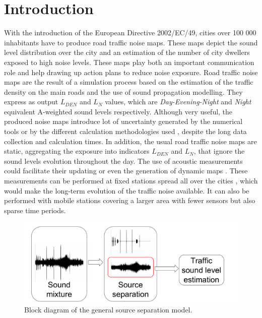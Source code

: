 \documentclass[twocolumn]{svjour3}          %
\begin{document}
\section{Introduction} \label{part:intro}

With the introduction of the European Directive 2002/\-EC/49, cities over 100 000 inhabitants have to produce road traffic noise maps. These maps depict the sound level distribution over the city and an estimation of the number of city dwellers exposed to high noise levels. These maps play both an important communication role and help drawing up action plans to reduce noise exposure. Road traffic noise maps are the result of a simulation process based on the estimation of the traffic density on the main roads and the use of sound propagation modelling. They express as output $L_ {DEN}$ and $L_N$ values, which are \textit{Day-Evening-Night} and \textit{Night} equivalent A-weighted sound levels respectively. Although very useful, the produced noise maps introduce lot of uncertainty generated by the numerical tools \cite{van_leeuwen_noise_2015} or by the different calculation methodologies used \cite{leroy_uncertainty_2010}\cite{garg_critical_2014}, despite the long data collection and calculation times. In addition, the usual road traffic noise maps are static, aggregating the exposure into indicators $L_{DEN}$ and $L_N$, that ignore the sound levels evolution throughout the day.
The use of acoustic measurements could facilitate their updating or even the generation of dynamic maps \cite{wei_dynamic_2016}. These measurements can be performed at fixed stations spread all over the cities \cite{Mioduszewski} \cite{mietlicki2012innovative}, which would make the long-term evolution of the traffic noise available. It can also be performed with  mobile stations \cite{can_exploring_2012} \cite{manvell2004sadmam} covering a larger area with fewer sensors but also sparse time periods.

\begin{figure}[t]
\centering
\includegraphics[width=\linewidth]{figures/bloc_diagram_source_separation.pdf}
\caption{Block diagram of the general source separation model.}
\label{fig:diagram}
\end{figure}
\end{document}
